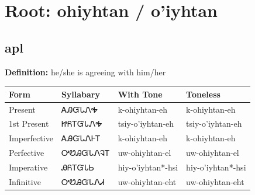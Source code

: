 \documentclass{article}%
\begin{document}
%
\normalsize%
\section*{Root: ohiyhtan / o'iyhtan}%
\subsection*{apl}%
\textbf{Definition: }%
he/she is agreeing with him/her%
\\[0.5em]%
\begin{tabular}{|l|l|l|l|}%
\hline%
\textbf{Form}&\textbf{Syllabary}&\textbf{With Tone}&\textbf{Toneless}\\%
\hline%
Present&ᎪᎯᏳᏓᏁᎭ&k{-}ohiyhtan{-}eh&k{-}ohiyhtan{-}eh\\%
1st Present&ᏥᏲᎢᏳᏓᏁᎭ&tsiy{-}o'iyhtan{-}eh&tsiy{-}o'iyhtan{-}eh\\%
Imperfective&ᎪᎯᏳᏓᏁᎰᎢ&k{-}ohiyhtan{-}eh&k{-}ohiyhtan{-}eh\\%
Perfective&ᎤᏬᎯᏳᏓᏁᎸᎢ&uw{-}ohiyhtan{-}el&uw{-}ohiyhtan{-}el\\%
Imperative&ᎯᏲᎢᏳᏓᏏ&hiy{-}o'iyhtan*{-}hsi&hiy{-}o'iyhtan*{-}hsi\\%
Infinitive&ᎤᏬᎯᏳᏓᏁᏗ&uw{-}ohiyhtan{-}eht&uw{-}ohiyhtan{-}eht\\%
\hline%
\end{tabular}%
\\[1em]%
\end{document}
